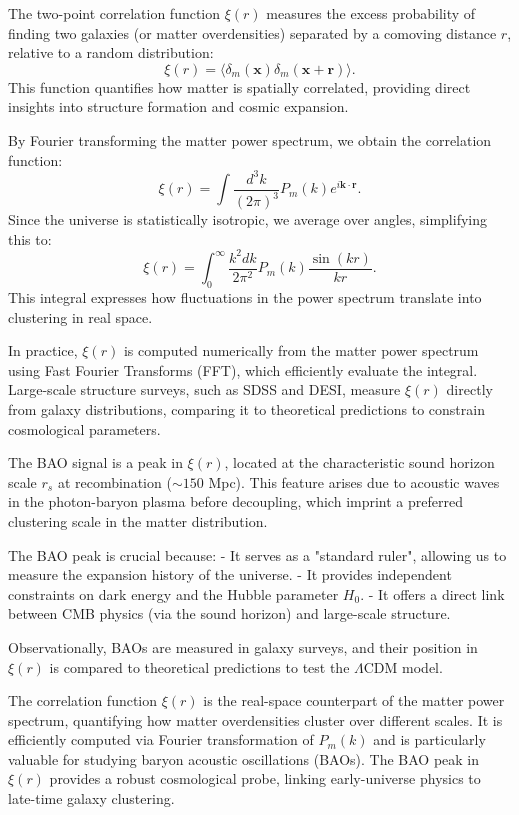 \documentclass{aa}
\begin{document}
The two-point correlation function $\xi(r)$ measures the excess probability of finding two galaxies (or matter overdensities) separated by a comoving distance $r$, relative to a random distribution:
\begin{equation}
\xi(r) = \langle \delta_m(\mathbf{x}) \delta_m(\mathbf{x} + \mathbf{r}) \rangle.
\end{equation}
This function quantifies how matter is spatially correlated, providing direct insights into structure formation and cosmic expansion.

By Fourier transforming the matter power spectrum, we obtain the correlation function:
\begin{equation}
\xi(r) = \int \frac{d^3k}{(2\pi)^3} P_m(k) e^{i\mathbf{k} \cdot \mathbf{r}}.
\end{equation}
Since the universe is statistically isotropic, we average over angles, simplifying this to:
\begin{equation}
\xi(r) = \int_0^\infty \frac{k^2 dk}{2\pi^2} P_m(k) \frac{\sin(kr)}{kr}.
\end{equation}
This integral expresses how fluctuations in the power spectrum translate into clustering in real space.

In practice, $\xi(r)$ is computed numerically from the matter power spectrum using Fast Fourier Transforms (FFT), which efficiently evaluate the integral. Large-scale structure surveys, such as SDSS and DESI, measure $\xi(r)$ directly from galaxy distributions, comparing it to theoretical predictions to constrain cosmological parameters.

The BAO signal is a peak in $\xi(r)$, located at the characteristic sound horizon scale $r_s$ at recombination ($\sim 150$ Mpc). This feature arises due to acoustic waves in the photon-baryon plasma before decoupling, which imprint a preferred clustering scale in the matter distribution.

The BAO peak is crucial because:  
- It serves as a "standard ruler", allowing us to measure the expansion history of the universe.  
- It provides independent constraints on dark energy and the Hubble parameter $H_0$.  
- It offers a direct link between CMB physics (via the sound horizon) and large-scale structure.  

Observationally, BAOs are measured in galaxy surveys, and their position in $\xi(r)$ is compared to theoretical predictions to test the $\Lambda$CDM model.

The correlation function $\xi(r)$ is the real-space counterpart of the matter power spectrum, quantifying how matter overdensities cluster over different scales. It is efficiently computed via Fourier transformation of $P_m(k)$ and is particularly valuable for studying baryon acoustic oscillations (BAOs). The BAO peak in $\xi(r)$ provides a robust cosmological probe, linking early-universe physics to late-time galaxy clustering.  
\end{document}
